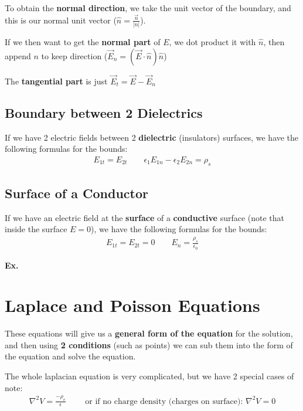\documentclass[12pt,letterpaper]{article} \usepackage{amsmath} \usepackage{graphicx} \usepackage[margin=1in]{geometry} \usepackage{longtable}  \usepackage{amssymb}
\begin{document}
	
	To obtain the \textbf{normal direction}, we take the unit vector of the boundary, and this is our normal unit vector ($\hat n = \frac{\vec n}{|n|}$).
	
	If we then want to get the \textbf{normal part} of $E$, we dot product it with $\hat n$, then append $n$ to keep direction ($\vec E_n = (\vec E\cdot \hat n)\hat n$)
	
	The \textbf{tangential part }is just $\vec E_t = \vec E - \vec E_n$

	\subsection{Boundary between 2 Dielectrics}
	If we have 2 electric fields between 2 \textbf{dielectric} (insulators) surfaces, we have the following formulas for the bounds:
	\begin{align*}
		E_{1t} = E_{2t} \qquad \epsilon_1E_{1n}-\epsilon_2 E_{2n} = \rho_s
	\end{align*}

	\subsection{Surface of a Conductor}
	If we have an electric field at the \textbf{surface }of a \textbf{conductive} surface (note that inside the surface $E=0$), we have the following formulas for the bounds:
	\begin{align*}
		E_{1t} = E_{2t} = 0 \qquad E_{n} = \frac{\rho_s}{\epsilon_0}
	\end{align*}

	\begin{mdframed}
		\textbf{Ex. }
	\end{mdframed}

	\section{Laplace and Poisson Equations}
	These equations will give us a \textbf{general form of the equation} for the solution, and then using \textbf{2 conditions} (such as points) we can sub them into the form of the equation and solve the equation. 
	
	The whole laplacian equation is very complicated, but we have 2 special cases of note:
	\begin{align*}
		\nabla^2 V = \frac{-\rho_v}{\epsilon} \qquad \text{ or if no charge density (charges on surface): } \nabla^2V=0
	\end{align*}
\end{document}
